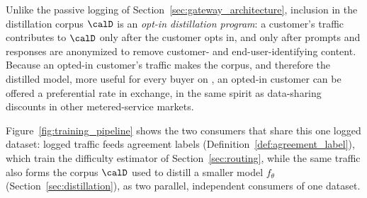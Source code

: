 Unlike the passive logging of Section~\ref{sec:gateway_architecture},
inclusion in the distillation corpus $\calD$ is an \emph{opt-in
distillation program}: a customer's traffic contributes to $\calD$ only
after the customer opts in, and only after prompts and responses are
anonymized to remove customer- and end-user-identifying content. Because
an opted-in customer's traffic makes the corpus, and therefore the
distilled model, more useful for every buyer on \NoesisMarket, an
opted-in customer can be offered a preferential rate in exchange, in the
same spirit as data-sharing discounts in other metered-service markets.

Figure~\ref{fig:training_pipeline} shows the two consumers that share
this one logged dataset: logged traffic feeds agreement labels
(Definition~\ref{def:agreement_label}), which train the difficulty
estimator of Section~\ref{sec:routing}, while the same traffic also forms
the corpus $\calD$ used to distill a smaller model $f_\theta$
(Section~\ref{sec:distillation}), as two parallel, independent consumers
of one dataset.

